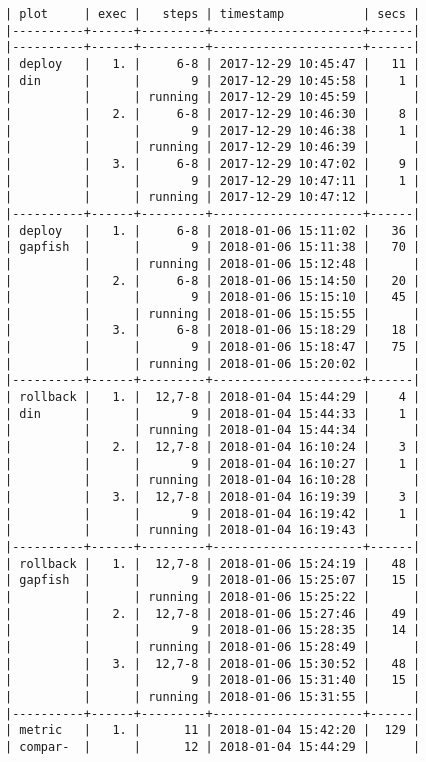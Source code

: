 \begin{verbatim}
| plot     | exec |   steps | timestamp           | secs |
|----------+------+---------+---------------------+------|
|----------+------+---------+---------------------+------|
| deploy   |   1. |     6-8 | 2017-12-29 10:45:47 |   11 |
| din      |      |       9 | 2017-12-29 10:45:58 |    1 |
|          |      | running | 2017-12-29 10:45:59 |      |
|          |   2. |     6-8 | 2017-12-29 10:46:30 |    8 |
|          |      |       9 | 2017-12-29 10:46:38 |    1 |
|          |      | running | 2017-12-29 10:46:39 |      |
|          |   3. |     6-8 | 2017-12-29 10:47:02 |    9 |
|          |      |       9 | 2017-12-29 10:47:11 |    1 |
|          |      | running | 2017-12-29 10:47:12 |      |
|----------+------+---------+---------------------+------|
| deploy   |   1. |     6-8 | 2018-01-06 15:11:02 |   36 |
| gapfish  |      |       9 | 2018-01-06 15:11:38 |   70 |
|          |      | running | 2018-01-06 15:12:48 |      |
|          |   2. |     6-8 | 2018-01-06 15:14:50 |   20 |
|          |      |       9 | 2018-01-06 15:15:10 |   45 |
|          |      | running | 2018-01-06 15:15:55 |      |
|          |   3. |     6-8 | 2018-01-06 15:18:29 |   18 |
|          |      |       9 | 2018-01-06 15:18:47 |   75 |
|          |      | running | 2018-01-06 15:20:02 |      |
|----------+------+---------+---------------------+------|
| rollback |   1. |  12,7-8 | 2018-01-04 15:44:29 |    4 |
| din      |      |       9 | 2018-01-04 15:44:33 |    1 |
|          |      | running | 2018-01-04 15:44:34 |      |
|          |   2. |  12,7-8 | 2018-01-04 16:10:24 |    3 |
|          |      |       9 | 2018-01-04 16:10:27 |    1 |
|          |      | running | 2018-01-04 16:10:28 |      |
|          |   3. |  12,7-8 | 2018-01-04 16:19:39 |    3 |
|          |      |       9 | 2018-01-04 16:19:42 |    1 |
|          |      | running | 2018-01-04 16:19:43 |      |
|----------+------+---------+---------------------+------|
| rollback |   1. |  12,7-8 | 2018-01-06 15:24:19 |   48 |
| gapfish  |      |       9 | 2018-01-06 15:25:07 |   15 |
|          |      | running | 2018-01-06 15:25:22 |      |
|          |   2. |  12,7-8 | 2018-01-06 15:27:46 |   49 |
|          |      |       9 | 2018-01-06 15:28:35 |   14 |
|          |      | running | 2018-01-06 15:28:49 |      |
|          |   3. |  12,7-8 | 2018-01-06 15:30:52 |   48 |
|          |      |       9 | 2018-01-06 15:31:40 |   15 |
|          |      | running | 2018-01-06 15:31:55 |      |
|----------+------+---------+---------------------+------|
| metric   |   1. |      11 | 2018-01-04 15:42:20 |  129 |
| compar-  |      |      12 | 2018-01-04 15:44:29 |      |

\end{verbatim}
